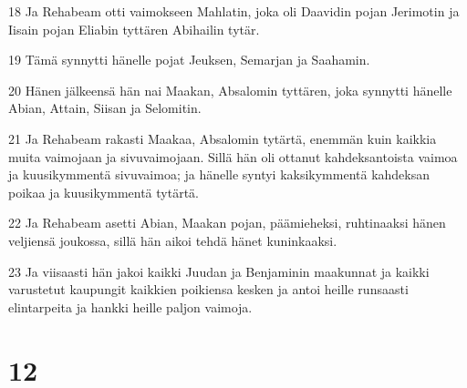 \par 18 Ja Rehabeam otti vaimokseen Mahlatin, joka oli Daavidin pojan Jerimotin ja Iisain pojan Eliabin tyttären Abihailin tytär.
\par 19 Tämä synnytti hänelle pojat Jeuksen, Semarjan ja Saahamin.
\par 20 Hänen jälkeensä hän nai Maakan, Absalomin tyttären, joka synnytti hänelle Abian, Attain, Siisan ja Selomitin.
\par 21 Ja Rehabeam rakasti Maakaa, Absalomin tytärtä, enemmän kuin kaikkia muita vaimojaan ja sivuvaimojaan. Sillä hän oli ottanut kahdeksantoista vaimoa ja kuusikymmentä sivuvaimoa; ja hänelle syntyi kaksikymmentä kahdeksan poikaa ja kuusikymmentä tytärtä.
\par 22 Ja Rehabeam asetti Abian, Maakan pojan, päämieheksi, ruhtinaaksi hänen veljiensä joukossa, sillä hän aikoi tehdä hänet kuninkaaksi.
\par 23 Ja viisaasti hän jakoi kaikki Juudan ja Benjaminin maakunnat ja kaikki varustetut kaupungit kaikkien poikiensa kesken ja antoi heille runsaasti elintarpeita ja hankki heille paljon vaimoja.

\chapter{12}

